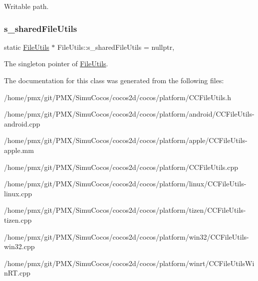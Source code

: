 Writable path. \mbox{\label{classFileUtils_aa5350a22566d3f1ca9b0e5bd1e088166}} 
\subsubsection{\texorpdfstring{s\+\_\+shared\+File\+Utils}{s\_sharedFileUtils}}
{\footnotesize\ttfamily static \hyperlink{classFileUtils}{File\+Utils} $\ast$ File\+Utils\+::s\+\_\+shared\+File\+Utils = nullptr\hspace{0.3cm}{\ttfamily [static]}, {\ttfamily [protected]}}

The singleton pointer of \hyperlink{classFileUtils}{File\+Utils}. 

The documentation for this class was generated from the following files\+:\begin{DoxyCompactItemize}
\item 
/home/pmx/git/\+P\+M\+X/\+Simu\+Cocos/cocos2d/cocos/platform/C\+C\+File\+Utils.\+h\item 
/home/pmx/git/\+P\+M\+X/\+Simu\+Cocos/cocos2d/cocos/platform/android/C\+C\+File\+Utils-\/android.\+cpp\item 
/home/pmx/git/\+P\+M\+X/\+Simu\+Cocos/cocos2d/cocos/platform/apple/C\+C\+File\+Utils-\/apple.\+mm\item 
/home/pmx/git/\+P\+M\+X/\+Simu\+Cocos/cocos2d/cocos/platform/C\+C\+File\+Utils.\+cpp\item 
/home/pmx/git/\+P\+M\+X/\+Simu\+Cocos/cocos2d/cocos/platform/linux/C\+C\+File\+Utils-\/linux.\+cpp\item 
/home/pmx/git/\+P\+M\+X/\+Simu\+Cocos/cocos2d/cocos/platform/tizen/C\+C\+File\+Utils-\/tizen.\+cpp\item 
/home/pmx/git/\+P\+M\+X/\+Simu\+Cocos/cocos2d/cocos/platform/win32/C\+C\+File\+Utils-\/win32.\+cpp\item 
/home/pmx/git/\+P\+M\+X/\+Simu\+Cocos/cocos2d/cocos/platform/winrt/C\+C\+File\+Utils\+Win\+R\+T.\+cpp\end{DoxyCompactItemize}
